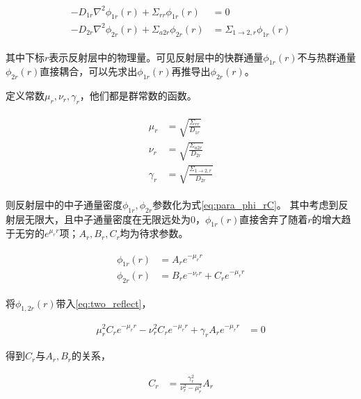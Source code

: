 \begin{align}
    \label{eq:two_reflect}
    \begin{split}
        -D_{1r}\nabla^2\phi_{1r}(r) + \Sigma_{rr}\phi_{1r}(r) &= 0 \\
        -D_{2r}\nabla^2\phi_{2r}(r) + \Sigma_{a2r}\phi_{2r}(r) &= \Sigma_{1\rightarrow 2,r}\phi_{1r}(r)
    \end{split}
\end{align}

其中下标$r$表示反射层中的物理量。可见反射层中的快群通量$\phi_{1r}(r)$不与热群通量$\phi_{2r}(r)$直接耦合，可以先求出$\phi_{1r}(r)$再推导出$\phi_{2r}(r)$。

定义常数$\mu_r,\nu_r,\gamma_r$，他们都是群常数的函数。

\begin{align}
    \label{eq:mu_nu_gamma}
    \begin{split}
        \mu_r &= \sqrt{\frac{\Sigma_{rr}}{D_{1r}}} \\
        \nu_r &= \sqrt{\frac{\Sigma_{a2r}}{D_{2r}}} \\
        \gamma_r &= \sqrt{\frac{\Sigma_{1\rightarrow 2,r}}{D_{2r}}}
    \end{split}
\end{align}

则反射层中的中子通量密度$\phi_{1r},\phi_{2r}$参数化为式\ref{eq:para_phi_rC}。
其中考虑到反射层无限大，且中子通量密度在无限远处为$0$，$\phi_{1r}(r)$直接舍弃了随着$r$的增大趋于无穷的$e^{\mu_r r}$项；$A_r,B_r,C_r$均为待求参数。

\begin{align}
    \label{eq:para_phi_rC}
    \begin{split}
        \phi_{1r}(r) &= A_r e^{-\mu_r r} \\
        \phi_{2r}(r) &= B_r e^{-\nu_r r} + C_r e^{-\mu_r r}
    \end{split}
\end{align}

将$\phi_{1,2r}(r)$带入\ref{eq:two_reflect}，

\begin{align}
    \mu_r^2 C_r e^{-\mu_r r} - \nu_r^2 C_r e^{-\mu_r r} + \gamma_r A_r e^{-\mu_r r} &= 0
\end{align}

得到$C_r$与$A_r,B_r$的关系，

\begin{align}
    C_r &= \frac{\gamma_r^2}{\nu_r^2 - \mu_r^2}A_r
\end{align}

